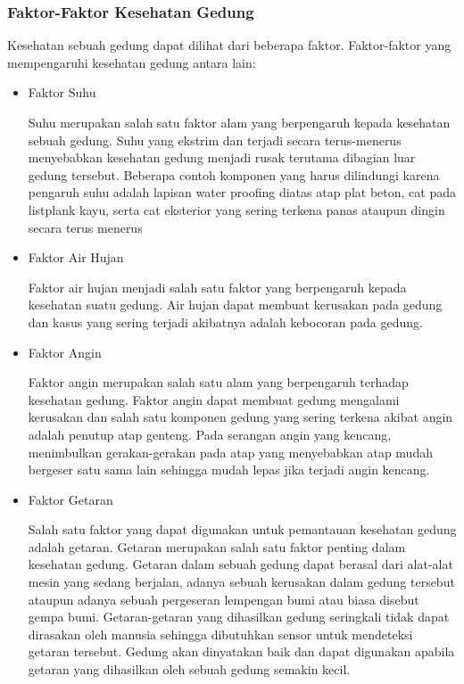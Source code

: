 \subsubsection{Faktor-Faktor Kesehatan Gedung}
Kesehatan sebuah gedung dapat dilihat dari beberapa faktor. Faktor-faktor yang mempengaruhi kesehatan gedung antara lain:
\begin{itemize}
	\item Faktor Suhu
	
	Suhu merupakan salah satu faktor alam yang berpengaruh kepada kesehatan sebuah gedung. Suhu yang ekstrim dan terjadi secara terus-menerus menyebabkan kesehatan gedung menjadi rusak terutama dibagian luar gedung tersebut. Beberapa contoh komponen yang harus dilindungi karena pengaruh suhu adalah lapisan water proofing diatas atap plat beton, cat pada listplank kayu, serta cat eksterior yang sering terkena panas ataupun dingin secara terus menerus
	
	\item Faktor Air Hujan
	
	Faktor air hujan menjadi salah satu faktor yang berpengaruh kepada kesehatan suatu gedung. Air hujan dapat membuat kerusakan pada gedung dan kasus yang sering terjadi akibatnya adalah kebocoran pada gedung.
	
	\item Faktor Angin
	
	Faktor angin merupakan salah satu alam yang berpengaruh terhadap kesehatan gedung. Faktor angin dapat membuat gedung mengalami kerusakan dan salah satu komponen gedung yang sering terkena akibat angin adalah penutup atap genteng. Pada serangan angin yang kencang, menimbulkan gerakan-gerakan pada atap yang menyebabkan atap mudah bergeser satu sama lain sehingga mudah lepas jika terjadi angin kencang.
	
	\item Faktor Getaran
	
	Salah satu faktor yang dapat digunakan untuk pemantauan kesehatan gedung adalah getaran. Getaran merupakan salah satu faktor penting dalam kesehatan gedung. Getaran dalam sebuah gedung dapat berasal dari alat-alat mesin yang sedang berjalan, adanya sebuah kerusakan dalam gedung tersebut ataupun adanya sebuah pergeseran lempengan bumi atau biasa disebut gempa bumi. Getaran-getaran yang dihasilkan gedung seringkali tidak dapat dirasakan oleh manusia sehingga dibutuhkan sensor untuk mendeteksi getaran tersebut. Gedung akan dinyatakan baik dan dapat digunakan apabila getaran yang dihasilkan oleh sebuah gedung semakin kecil.
	

\end{itemize}
